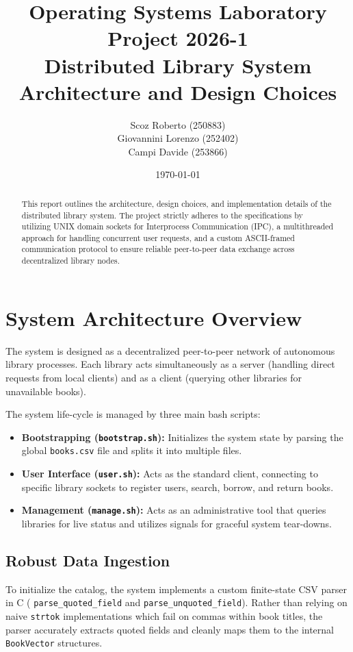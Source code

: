 \documentclass[11pt, a4paper]{article}
\title{\textbf{Operating Systems Laboratory Project 2026-1}\\ \Large Distributed Library System Architecture and Design Choices}
\author{
    Scoz Roberto (250883) \\
    Giovannini Lorenzo (252402) \\
    Campi Davide (253866)
}
\date{\today}
\begin{document}
\maketitle

\begin{abstract}
This report outlines the architecture, design choices, and implementation details of the distributed library system. The project strictly adheres to the specifications by utilizing UNIX domain sockets for Interprocess Communication (IPC), a multithreaded approach for handling concurrent user requests, and a custom ASCII-framed communication protocol to ensure reliable peer-to-peer data exchange across decentralized library nodes.
\end{abstract}

\section{System Architecture Overview}
The system is designed as a decentralized peer-to-peer network of autonomous library processes. Each library acts simultaneously as a server (handling direct requests from local clients) and as a client (querying other libraries for unavailable books). 

The system life-cycle is managed by three main bash scripts:
\begin{itemize}[leftmargin=*]
    \item \textbf{Bootstrapping (\texttt{bootstrap.sh}):} Initializes the system state by parsing the global \texttt{books.csv} file and splits it into multiple files.
    \item \textbf{User Interface (\texttt{user.sh}):} Acts as the standard client, connecting to specific library sockets to register users, search, borrow, and return books.
    \item \textbf{Management (\texttt{manage.sh}):} Acts as an administrative tool that queries libraries for live status and utilizes signals for graceful system tear-downs.
\end{itemize}

\subsection{Robust Data Ingestion}
To initialize the catalog, the system implements a custom finite-state CSV parser in C (
\texttt{parse\_quoted\_field} and \texttt{parse\_unquoted\_field}). Rather than relying on naive \texttt{strtok} 
implementations which fail on commas within book titles, the parser accurately extracts quoted fields and cleanly maps them to the internal \texttt{BookVector} structures.
\end{document}
